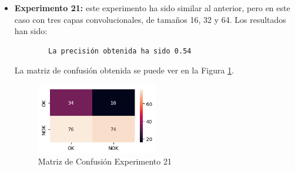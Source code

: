 \begin{itemize}
    \item \textbf{Experimento 21:} este experimento ha sido similar al anterior, pero en este caso con tres capas convolucionales, de tamaños 16, 32 y 64. Los resultados han sido:
    \begin{verbatim}
        La precisión obtenida ha sido 0.54
    \end{verbatim}
    La matriz de confusión obtenida se puede ver en la Figura \ref{f:exp21}.
    \begin{figure}[h]
     \centering
      \includegraphics[width=0.5\textwidth]{img/exp21.PNG}
     \caption{Matriz de Confusión Experimento 21}
     \label{f:exp21}
    \end{figure}
    
\end{itemize}

